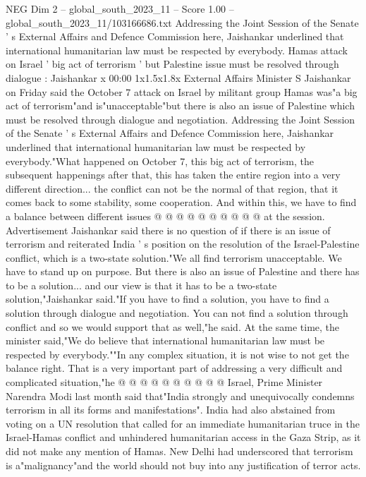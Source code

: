 \begin{textsample}{NEG Dim 2 – global\_south\_2023\_11 – Score 1.00 – global\_south\_2023\_11/103166686.txt}  \label{ex:f2_neg_352}
Addressing the Joint Session of the Senate ' s External Affairs and Defence Commission here, Jaishankar underlined that international humanitarian law must be respected by everybody.
Hamas attack on Israel ' big act of terrorism ' but Palestine issue must be resolved through dialogue : Jaishankar x 00:00 1x1.5x1.8x External Affairs Minister S Jaishankar on Friday said the October 7 attack on Israel by militant group Hamas was"a big act of terrorism"and is"unacceptable"but there is also an issue of Palestine which must be resolved through dialogue and negotiation.
Addressing the Joint Session of the Senate ' s External Affairs and Defence Commission here, Jaishankar underlined that international humanitarian law must be respected by everybody."What happened on October 7, this big act of terrorism, the subsequent happenings after that, this has taken the entire region into a very different direction... the conflict can not be the normal of that region, that it comes back to some stability, some cooperation.
And within this, we have to find a balance between different issues @ @ @ @ @ @ @ @ @ @ at the session.
Advertisement Jaishankar said there is no question of if there is an issue of terrorism and reiterated India ' s position on the resolution of the Israel-Palestine conflict, which is a two-state solution."We all find terrorism unacceptable.
We have to stand up on purpose.
But there is also an issue of Palestine and there has to be a solution... and our view is that it has to be a two-state solution,"Jaishankar said."If you have to find a solution, you have to find a solution through dialogue and negotiation.
You can not find a solution through conflict and so we would support that as well,"he said.
At the same time, the minister said,"We do believe that international humanitarian law must be respected by everybody.""In any complex situation, it is not wise to not get the balance right.
That is a very important part of addressing a very difficult and complicated situation,"he @ @ @ @ @ @ @ @ @ @ Israel, Prime Minister Narendra Modi last month said that"India strongly and unequivocally condemns terrorism in all its forms and manifestations".
India had also abstained from voting on a UN resolution that called for an immediate humanitarian truce in the Israel-Hamas conflict and unhindered humanitarian access in the Gaza Strip, as it did not make any mention of Hamas.
New Delhi had underscored that terrorism is a"malignancy"and the world should not buy into any justification of terror acts.

\end{textsample}
